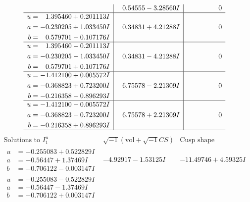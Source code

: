 \documentclass[1p]{elsarticle_modified}
\theoremstyle{definition}
\newcommand{\I}{\sqrt{-1}}
\begin{document}
$$\begin{array}{c|c|c}
 & \phantom{-}0.54555 - 3.28560 I & \phantom{-0.000000 } 0 \\ \hline\begin{aligned}
u &= \phantom{-}1.395460 + 0.201113 I \\
a &= -0.230205 + 1.033450 I \\
b &= \phantom{-}0.579701 - 0.107176 I\end{aligned}
 & \phantom{-}0.34831 + 4.21288 I & \phantom{-0.000000 } 0 \\ \hline\begin{aligned}
u &= \phantom{-}1.395460 - 0.201113 I \\
a &= -0.230205 - 1.033450 I \\
b &= \phantom{-}0.579701 + 0.107176 I\end{aligned}
 & \phantom{-}0.34831 - 4.21288 I & \phantom{-0.000000 } 0 \\ \hline\begin{aligned}
u &= -1.412100 + 0.005572 I \\
a &= -0.368823 + 0.723200 I \\
b &= -0.216358 - 0.896293 I\end{aligned}
 & \phantom{-}6.75578 - 2.21309 I & \phantom{-0.000000 } 0 \\ \hline\begin{aligned}
u &= -1.412100 - 0.005572 I \\
a &= -0.368823 - 0.723200 I \\
b &= -0.216358 + 0.896293 I\end{aligned}
 & \phantom{-}6.75578 + 2.21309 I & \phantom{-0.000000 } 0\\
 \hline 
 \end{array}$$\newpage$$\begin{array}{c|c|c}  
\text{Solutions to }I^u_{1}& \I (\text{vol} + \sqrt{-1}CS) & \text{Cusp shape}\\
 \hline 
\begin{aligned}
u &= -0.255083 + 0.522829 I \\
a &= -0.56447 + 1.37469 I \\
b &= -0.706122 - 0.003147 I\end{aligned}
 & -4.92917 - 1.53125 I & -11.49746 + 4.59325 I \\ \hline\begin{aligned}
u &= -0.255083 - 0.522829 I \\
a &= -0.56447 - 1.37469 I \\
b &= -0.706122 + 0.003147 I\end{aligned}

\end{array}$$
\end{document}
